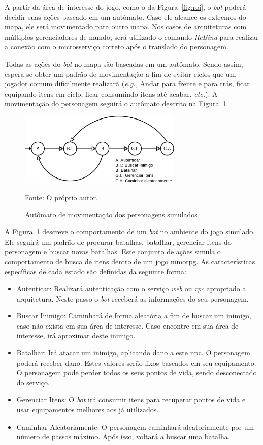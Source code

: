 A partir da área de interesse do jogo, como o da Figura~\ref{fig:roi}, o \textit{bot} poderá decidir suas ações baseado em um autômato.
%
Caso ele alcance os extremos do mapa, ele será movimentado para outro mapa.
%
Nos casos de arquiteturas com múltiplos gerenciadores de mundo, será utilizado o comando \textit{ReBind} para realizar a conexão com o microsserviço correto após o translado do personagem.



Todas as ações do \textit{bot} no mapa são baseadas em um autômato.
%
Sendo assim, espera-se obter um padrão de movimentação a fim de evitar ciclos que um jogador comum dificilmente realizará (\textit{e.g.,} Andar para frente e para trás, ficar equipando itens em ciclo, ficar consumindo itens até acabar, \textit{etc.}).
%
A movimentação do personagem seguirá o autômato descrito na Figura~\ref{fig:movimentacao}.


\begin{figure}[htb!]
  \caption{Autômato de movimentação dos personagens simulados}
  \label{fig:movimentacao}
  \includegraphics[height=3.5cm]{img/cap3/movimentacao.png}
  \centering

  Fonte: O próprio autor.
\end{figure}

A Figura~\ref{fig:movimentacao} descreve o comportamento de um \textit{bot} no ambiente do jogo simulado.
%
Ele seguirá um padrão de procurar batalhas, batalhar, gerenciar itens do personagem e buscar novas batalhas.
%
Este conjunto de ações simula o comportamento de busca de itens dentro de um jogo \ac{mmorpg}.
%
As características específicas de cada estado são definidas da seguinte forma:

\begin{itemize}
  \item Autenticar: Realizará autenticação com o serviço \textit{web} ou \textit{rpc} apropriado a arquitetura. Neste passo o \textit{bot} receberá as informações do seu personagem.
  \item Buscar Inimigo: Caminhará de forma aleatória a fim de buscar um inimigo, caso não exista em sua área de interesse. Caso encontre em sua área de interesse, irá aproximar deste inimigo.
  \item Batalhar: Irá atacar um inimigo, aplicando dano a este \ac{npc}. O personagem poderá receber dano. Estes valores serão fixos baseados em seu equipamento. O personagem pode perder todos os seus pontos de vida, sendo desconectado do serviço.
  \item Gerenciar Itens: O \textit{bot} irá consumir itens para recuperar pontos de vida e usar equipamentos melhores aos já utilizados.
  \item Caminhar Aleatoriamente: O personagem caminhará aleatoriamente por um número de passos máximo. Após isso, voltará a buscar uma batalha.
\end{itemize}

